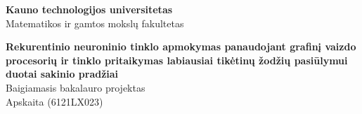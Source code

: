 

\begin{titlepage}
  \begin{center}


    \begin{figure}[H]
      \centering
    \end{figure}

    \vspace*{30pt}

    \fontXII
    \textbf{Kauno technologijos universitetas}\\
    Matematikos ir gamtos mokslų fakultetas

    \vspace*{80pt}

    \fontXVIII
	   \textbf{Rekurentinio neuroninio tinklo apmokymas panaudojant grafinį vaizdo procesorių ir tinklo pritaikymas labiausiai tikėtinų žodžių pasiūlymui duotai sakinio pradžiai}\\
     \fontXIV
     Baigiamasis bakalauro projektas\\
     Apskaita (6121LX023)

     \vspace*{40pt}

     \fontXII




\end{center}
\end{titlepage}
